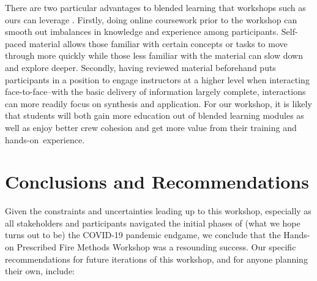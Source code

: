 \documentclass[fire,casereport,accept,moreauthors,pdftex]{Definitions/mdpi}  %
\begin{document}
There are two particular advantages to blended learning that workshops such as ours can leverage \citep{cantrell2014}.
Firstly, doing online coursework prior to the workshop can smooth out imbalances in knowledge and experience among participants.
Self-paced material allows those familiar with certain concepts or tasks to move through more quickly while those less familiar with the material can slow down and explore deeper. Secondly, having reviewed material beforehand puts participants in a position to engage instructors at a higher level when interacting face-to-face--with the basic delivery of information largely complete, interactions can more readily focus on synthesis and application.
For our workshop, it is likely that students will both gain more education out of blended learning modules as well as enjoy better crew cohesion and get more value from their training and hands-on~experience.

\section{Conclusions and Recommendations}

Given the constraints and uncertainties leading up to this workshop, especially as all stakeholders and participants navigated the initial phases of (what we hope turns out to be) the COVID-19 pandemic endgame, we conclude that the Hands-on Prescribed Fire Methods Workshop was a resounding success.
Our specific recommendations for future iterations of this workshop, and for anyone planning their own, include: 
\end{document}
